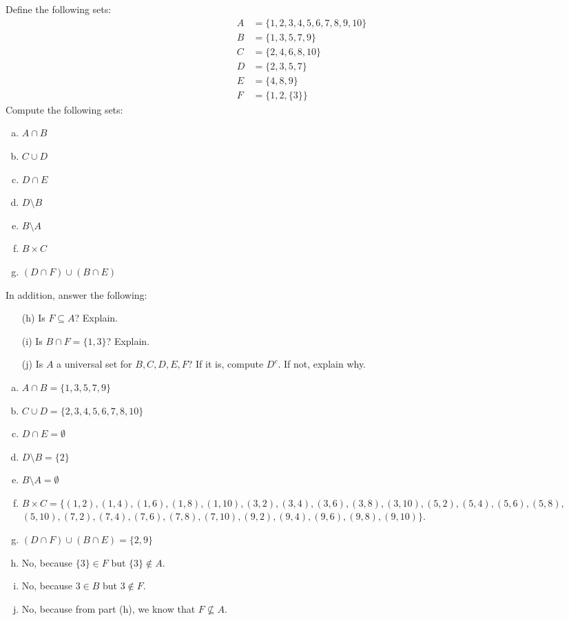 \documentclass[11pt,letterpaper]{article}
\begin{document}
 Define the following sets:
	\[
	\begin{aligned}
	A&= \{ 1, 2, 3, 4, 5, 6, 7, 8, 9, 10 \} \\
	B&= \{ 1, 3, 5, 7, 9 \} \\
	C&= \{ 2, 4, 6, 8, 10 \} \\
	D&= \{ 2, 3, 5, 7 \} \\
	E&= \{ 4, 8, 9 \} \\
	F&= \{ 1, 2, \{3\} \} 
	\end{aligned}
	\]
Compute the following sets:
	\begin{enumerate}[(a)] \itemsep=0.2ex
	\item $A \cap B$
	\item $C \cup D$
	\item $D \cap E$
	\item $D \setminus B$
	\item $B \setminus A$
	\item $B \times C$
	\item $(D \cap F) \cup (B \cap E)$
	\end{enumerate}
In addition, answer the following:
	\begin{enumerate} \itemsep=0.2ex
	\item[(h)] Is $F \subseteq A$? Explain. 
	\item[(i)] Is $B \cap F= \{ 1, 3 \}$? Explain. 
	\item[(j)] Is $A$ a universal set for $B, C, D, E, F$? If it is, compute $D^c$. If not, explain why. 
	\end{enumerate} 

\sol
\begin{enumerate}[(a)]
\item $A \cap B= \{ 1, 3, 5, 7, 9 \}$
\item $C \cup D= \{ 2, 3, 4, 5, 6, 7, 8, 10 \}$
\item $D \cap E= \emptyset$
\item $D \setminus B= \{ 2 \}$
\item $B \setminus A= \emptyset$
\item $B \times C= \{ (1, 2), (1, 4), (1, 6), (1, 8), (1, 10), (3, 2), (3, 4), (3, 6), (3, 8), (3, 10), (5, 2), (5, 4), (5, 6), (5, 8),$ $(5, 10), (7, 2), (7, 4), (7, 6), (7, 8), (7, 10), (9, 2), (9, 4), (9, 6), (9, 8), (9, 10) \}$. 
\item $(D \cap F) \cup (B \cap E)= \{ 2, 9 \}$
\item No, because $\{ 3 \} \in F$ but $\{ 3 \} \notin A$. 
\item No, because $3 \in B$ but $3 \notin F$.
\item No, because from part (h), we know that $F \not\subseteq A$. 
\end{enumerate}
\end{document}
